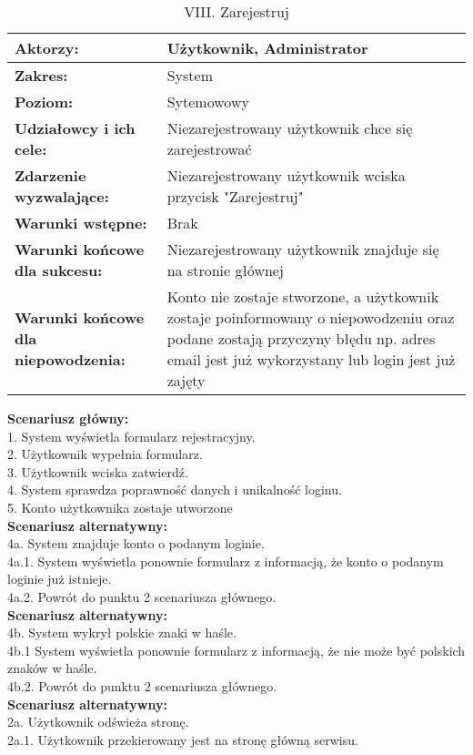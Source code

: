 	\begin{table}[H]
\centering
\caption{VIII. Zarejestruj}
\label{Zarejestruj}
\begin{tabular}{|p{7cm}|p{7cm}|}
  \hline 
  \textbf{Aktorzy:} & Użytkownik, Administrator\\
  \hline
  \textbf{Zakres:} & System \\
	\hline
  \textbf{Poziom:} & Sytemowowy \\
	\hline
  \textbf{Udziałowcy i ich cele: } & Niezarejestrowany użytkownik chce się zarejestrować \\
	\hline
  \textbf{Zdarzenie wyzwalające: } & Niezarejestrowany użytkownik wciska przycisk "Zarejestruj"\\
	\hline
  \textbf{Warunki wstępne: } & Brak \\
	\hline
  \textbf{Warunki końcowe dla sukcesu:} & Niezarejestrowany użytkownik znajduje się na stronie głównej\\
	\hline
  \textbf{Warunki końcowe dla niepowodzenia:} & Konto nie zostaje stworzone, a użytkownik zostaje poinformowany o niepowodzeniu oraz podane zostają przyczyny błędu np. adres email jest już wykorzystany lub login jest już zajęty \\
  \hline
\end{tabular} 
\end{table}

\textbf{Scenariusz główny:}\\
1. System wyświetla formularz rejestracyjny.\\
2. Użytkownik wypełnia formularz.\\
3. Użytkownik wciska zatwierdź.\\
4. System sprawdza poprawność danych i unikalność loginu.\\
5. Konto użytkownika zostaje utworzone\\
\textbf{Scenariusz alternatywny:}\\
4a. System znajduje konto o podanym loginie.\\
4a.1. System wyświetla ponownie formularz z informacją, że konto o podanym loginie już
istnieje.\\
4a.2. Powrót do punktu 2 scenariusza głównego.\\
\textbf{Scenariusz alternatywny:}\\
4b. System wykrył polskie znaki w haśle.\\
4b.1 System wyświetla ponownie formularz z informacją, że nie może być polskich znaków
w haśle.\\
4b.2. Powrót do punktu 2 scenariusza głównego.\\
\textbf{Scenariusz alternatywny:}\\
2a. Użytkownik odświeża stronę.\\
2a.1. Użytkownik przekierowany jest na stronę główną serwisu.\\

